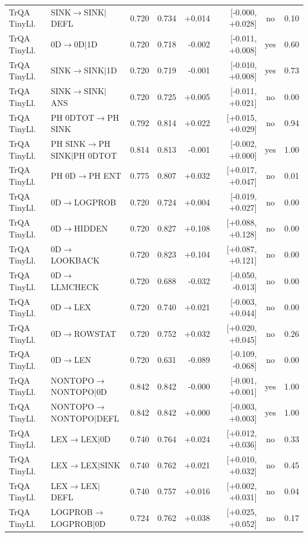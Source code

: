\begin{longtable}{llrrrrcc}
TrQA TinyLl. & SINK$\to$SINK$\mid$DEFL & 0.720 & 0.734 & +0.014 & [-0.000, +0.028] & no & 0.10 \\
TrQA TinyLl. & 0D$\to$0D$\mid$1D & 0.720 & 0.718 & -0.002 & [-0.011, +0.008] & yes & 0.60 \\
TrQA TinyLl. & SINK$\to$SINK$\mid$1D & 0.720 & 0.719 & -0.001 & [-0.010, +0.008] & yes & 0.73 \\
TrQA TinyLl. & SINK$\to$SINK$\mid$ANS & 0.720 & 0.725 & +0.005 & [-0.011, +0.021] & no & 0.00 \\
TrQA TinyLl. & PH 0DTOT$\to$PH SINK & 0.792 & 0.814 & +0.022 & [+0.015, +0.029] & no & 0.94 \\
TrQA TinyLl. & PH SINK$\to$PH SINK$\mid$PH 0DTOT & 0.814 & 0.813 & -0.001 & [-0.002, +0.000] & yes & 1.00 \\
TrQA TinyLl. & PH 0D$\to$PH ENT & 0.775 & 0.807 & +0.032 & [+0.017, +0.047] & no & 0.01 \\
TrQA TinyLl. & 0D$\to$LOGPROB & 0.720 & 0.724 & +0.004 & [-0.019, +0.027] & no & 0.00 \\
TrQA TinyLl. & 0D$\to$HIDDEN & 0.720 & 0.827 & +0.108 & [+0.088, +0.128] & no & 0.00 \\
TrQA TinyLl. & 0D$\to$LOOKBACK & 0.720 & 0.823 & +0.104 & [+0.087, +0.121] & no & 0.00 \\
TrQA TinyLl. & 0D$\to$LLMCHECK & 0.720 & 0.688 & -0.032 & [-0.050, -0.013] & no & 0.00 \\
TrQA TinyLl. & 0D$\to$LEX & 0.720 & 0.740 & +0.021 & [-0.003, +0.044] & no & 0.00 \\
TrQA TinyLl. & 0D$\to$ROWSTAT & 0.720 & 0.752 & +0.032 & [+0.020, +0.045] & no & 0.26 \\
TrQA TinyLl. & 0D$\to$LEN & 0.720 & 0.631 & -0.089 & [-0.109, -0.068] & no & 0.00 \\
TrQA TinyLl. & NONTOPO$\to$NONTOPO$\mid$0D & 0.842 & 0.842 & -0.000 & [-0.001, +0.001] & yes & 1.00 \\
TrQA TinyLl. & NONTOPO$\to$NONTOPO$\mid$DEFL & 0.842 & 0.842 & +0.000 & [-0.003, +0.003] & yes & 1.00 \\
TrQA TinyLl. & LEX$\to$LEX$\mid$0D & 0.740 & 0.764 & +0.024 & [+0.012, +0.036] & no & 0.33 \\
TrQA TinyLl. & LEX$\to$LEX$\mid$SINK & 0.740 & 0.762 & +0.021 & [+0.010, +0.032] & no & 0.45 \\
TrQA TinyLl. & LEX$\to$LEX$\mid$DEFL & 0.740 & 0.757 & +0.016 & [+0.002, +0.031] & no & 0.04 \\
TrQA TinyLl. & LOGPROB$\to$LOGPROB$\mid$0D & 0.724 & 0.762 & +0.038 & [+0.025, +0.052] & no & 0.17 \\

\end{longtable}
